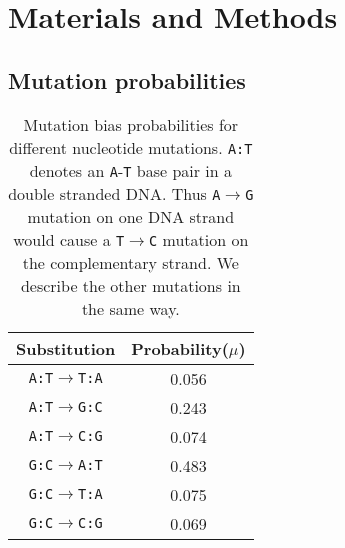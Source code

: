 \documentclass[12pt,a4paper]{article}
\begin{document}
\section*{Materials and Methods}

\subsection{Mutation probabilities}

\begin{table}[H]
\centering
\begin{tabular}{c c}
\toprule
\textbf{Substitution} & Probability($\mu$) \\\midrule
\texttt{A:T}$\to$\texttt{T:A} & 0.056 \\\midrule
\texttt{A:T}$\to$\texttt{G:C} & 0.243 \\\midrule
\texttt{A:T}$\to$\texttt{C:G} & 0.074 \\\midrule
\texttt{G:C}$\to$\texttt{A:T} & 0.483 \\\midrule
\texttt{G:C}$\to$\texttt{T:A} & 0.075 \\\midrule
\texttt{G:C}$\to$\texttt{C:G} & 0.069 \\\bottomrule
\end{tabular}
\caption{Mutation bias probabilities for different nucleotide mutations. \texttt{A:T} denotes an \texttt{A}-\texttt{T} base pair in a double stranded DNA. Thus \texttt{A}$\to$\texttt{G} mutation on one DNA strand would cause a \texttt{T}$\to$\texttt{C} mutation on the complementary strand. We describe the other mutations in the same way.}
\label{mutbias}
\end{table}
\end{document}
